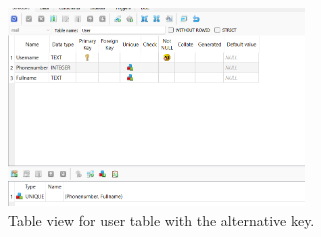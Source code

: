 \documentclass[a4paper,11pt,oneside]{article}
\begin{document}
\begin{sloppypar}
\begin{figure}[!htb]
  \centering
  \includegraphics[width=0.7\textwidth]{sqlitestudio/alternative_key/alternative_key_success.png}
  \caption{Table view for user table with the alternative key.}
  \label{fig:SucessAlternativeKey}
\end{figure}


\end{sloppypar}
\end{document}
